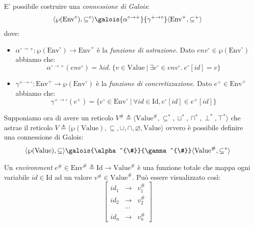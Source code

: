 \documentclass{article}
\newcommand{\envplus}{\textrm{Env}^+}
\newcommand{\envcirc}{\textrm{Env}^{\circ}}
\newcommand{\envsharp}{\textrm{Env}^{\#}}
\newcommand{\posetOf}[2]{\langle #1,\subseteq^{#2},\sqcup^{#2},\sqcap^{#2},\perp^{#2},\top^{#2}\rangle}
\begin{document}
E' possibile costruire una \textit{connessione di Galois}:  \[
	\langle 
	\wp(\envcirc), 
	\subseteq^{\circ}
	\rangle 
\galois
{\alpha^{\circ\rightarrow +}}
{\gamma^{+ \rightarrow\circ}} 
	\langle 
	\envplus, 
	\subseteq^+
	\rangle
\]
dove: 
\begin{itemize}
\item \(\alpha^{\circ\rightarrow +} : \wp(\envcirc)\rightarrow\envplus\) è la \textit{funzione di astrazione}. Dato \(env^{\circ} \in \wp(\envcirc)\) abbiamo che:
\[\alpha^{\circ\rightarrow +}(env^{\circ}) = \lambda id.\ \{v \in\textrm{Value}\ \vert\ \exists e^{\circ}\in env^{\circ}.\ e^{\circ}[id] = v\}\]
\item \(\gamma^{+ \rightarrow\circ} : \envplus\rightarrow\wp(\envcirc)\) è la \textit{funzione di concretizzazione}. Dato \(e^+ \in \envplus\) abbiamo che:
\[\gamma^{+ \rightarrow\circ}(e^+) = \{e^{\circ} \in\envcirc\ \vert\ \forall id\in\textrm{Id}, e^{\circ}[id]\in e^+[id]\}\]
\end{itemize}

Supponiamo ora di avere un reticolo  \(V^{\#}\triangleq\posetOf{\textrm{Value}^{\#}}{\ast}\) che astrae il reticolo  \(V\triangleq\langle\wp(\textrm{Value}),\subseteq,\cup,\cap,\varnothing,\textrm{Value}\rangle\) ovvero è possibile definire una connessione di Galois:
\[
	\langle\wp(\textrm{Value}), \subseteq\rangle
	\galois{\alpha^{\#}}{\gamma^{\#}}
	\langle\textrm{Value}^{\#}, \subseteq^{\ast}\rangle
\]

Un \textit{environment} \(e^{\#}\in\envsharp\triangleq \mathrm{Id}\rightarrow \textrm{Value}^{\#}\) è una funzione totale che mappa ogni variabile \(id \in\textrm{Id}\) ad un valore \(v^{\#}\in\textrm{Value}^{\#}\). Può essere visualizzato così:
\[
  \left[
  \begin{array}{ccl}
  id_1 &\longrightarrow &v^{\#}_1 \\
  id_2 &\longrightarrow &v^{\#}_2 \\
      &\cdots          &  \\
  id_n &\longrightarrow &v^{\#}_n
  \end{array}
  \right]
\]
\end{document}
